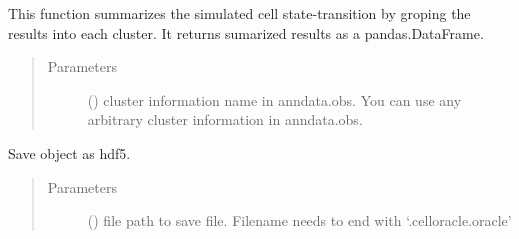 \documentclass[letterpaper,10pt,english]{sphinxmanual}
\begin{document}
\begin{fulllineitems}
\begin{fulllineitems}
\begin{quote}
\begin{description}
\begin{itemize}
\end{itemize}

\end{description}\end{quote}

\end{fulllineitems}


\begin{fulllineitems}
\label{\detokenize{modules/celloracle:celloracle.Oracle.summarize_mc_results_by_cluster}}
This function summarizes the simulated cell state-transition by groping the results into each cluster.
It returns sumarized results as a pandas.DataFrame.
\begin{quote}\begin{description}
\item[{Parameters}] \leavevmode
{} () \textendash{} cluster information name in anndata.obs.
You can use any arbitrary cluster information in anndata.obs.

\end{description}\end{quote}

\end{fulllineitems}


\begin{fulllineitems}
\label{\detokenize{modules/celloracle:celloracle.Oracle.to_hdf5}}
Save object as hdf5.
\begin{quote}\begin{description}
\item[{Parameters}] \leavevmode
{} () \textendash{} file path to save file. Filename needs to end with ‘.celloracle.oracle’

\end{description}\end{quote}

\end{fulllineitems}



\end{fulllineitems}
\end{document}

